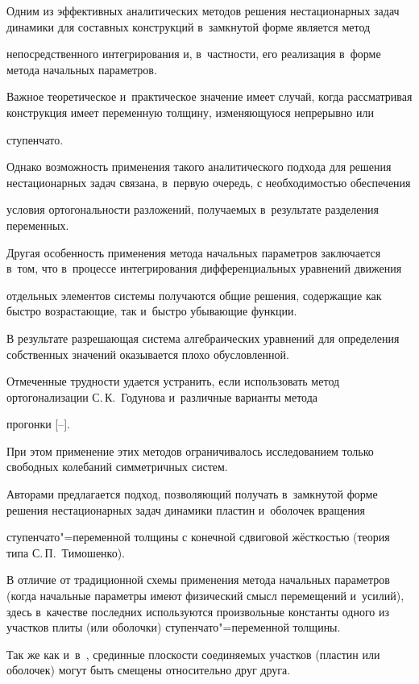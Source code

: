  Одним из эффективных аналитических методов решения нестационарных задач динамики для составных конструкций в~замкнутой форме является метод

непосредственного интегрирования  и, в~частности, его реализация в~форме метода начальных параметров.

Важное теоретическое и~практическое значение имеет  случай, когда рассматривая конструкция имеет переменную толщину, изменяющуюся непрерывно или

ступенчато.

Однако возможность применения  такого аналитического подхода для решения нестационарных задач связана, в~первую очередь, с необходимостью обеспечения

условия ортогональности разложений, получаемых в~результате разделения переменных.

Другая особенность применения метода начальных параметров  заключается в~том, что в~процессе интегрирования дифференциальных уравнений движения

отдельных элементов системы получаются общие решения, содержащие как быстро возрастающие, так и~быстро убывающие функции.

В результате разрешающая система алгебраических уравнений для определения собственных значений оказывается плохо обусловленной.

Отмеченные трудности удается устранить, если использовать метод ортогонализации С.\,К.~Годунова и~различные варианты метода

прогонки [--].

При этом применение этих  методов ограничивалось исследованием только свободных колебаний симметричных систем.



Авторами предлагается подход, позволяющий получать в~замкнутой форме решения нестационарных задач динамики пластин и~оболочек вращения

ступенчато"=переменной толщины с конечной сдвиговой жёсткостью (теория типа С.\,П.~Тимошенко).

В отличие от традиционной схемы применения метода начальных параметров (когда начальные параметры имеют физический смысл перемещений и~усилий), здесь в~качестве последних используются произвольные константы одного из участков плиты (или оболочки) ступенчато"=переменной толщины.

Так же как и~в~\cite{dyach:bib:Elen}, срединные плоскости соединяемых участков (пластин или оболочек) могут быть смещены относительно друг друга.

